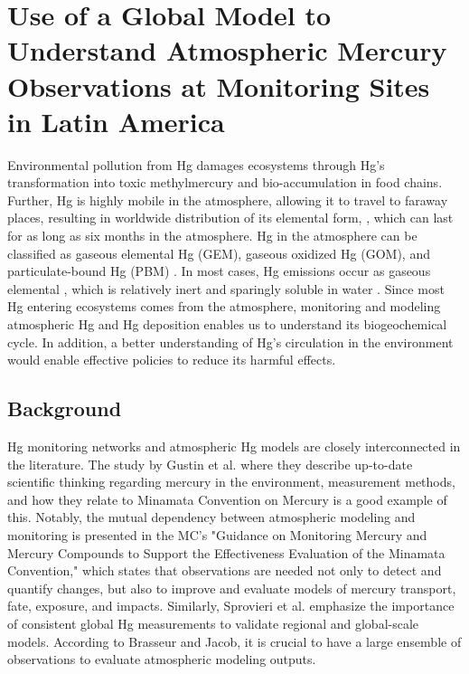 \chapter{Use of a Global Model to Understand Atmospheric Mercury Observations at Monitoring Sites in Latin America }\label{chapter2}
\begin{flushleft}
Environmental pollution from Hg damages ecosystems through Hg's transformation into toxic methylmercury and bio-accumulation in food chains. Further, Hg is highly mobile in the atmosphere, allowing it to travel to faraway places, resulting in worldwide distribution of its elemental form, \hg, which can last for as long as six months in the atmosphere\cite{horowitz_new_2017,shah_improved_2021}. Hg in the atmosphere can be classified as gaseous elemental Hg (GEM), gaseous oxidized Hg (GOM), and particulate-bound Hg (PBM)  \cite{lindberg_synthesis_2007,schroeder_atmospheric_1998,landis_development_2002}. In most cases, Hg emissions occur as gaseous elemental \hg, which is relatively inert and sparingly soluble in water \cite{horowitz_new_2017}. Since most Hg entering ecosystems comes from the atmosphere, monitoring and modeling atmospheric Hg and Hg deposition enables us to understand its biogeochemical cycle. In addition, a better understanding of Hg's circulation in the environment would enable effective policies to reduce its harmful effects.
\end{flushleft}
\section{Background}\label{chapter2_background}
\begin{flushleft}

Hg monitoring networks and atmospheric Hg models are closely interconnected in the literature. The study by Gustin et al.\cite{gustin_mercury_2020} where they describe up-to-date scientific thinking regarding mercury in the environment, measurement methods, and how they relate to Minamata Convention on Mercury is a good example of this. Notably, the mutual dependency between atmospheric modeling and monitoring is presented in the MC's "Guidance on Monitoring Mercury and Mercury Compounds to Support the Effectiveness Evaluation of the Minamata Convention," which states that observations are needed not only to detect and quantify changes, but also to improve and evaluate models of mercury transport, fate, exposure, and impacts\cite{unep_guidance_2021}. Similarly, Sprovieri et al.\cite{sprovieri_atmospheric_2016} emphasize the importance of consistent global Hg measurements to validate regional and global-scale models.  According to Brasseur and Jacob\cite{brasseur_modeling_2017}, it is crucial to have a large ensemble of observations to evaluate atmospheric modeling outputs.
\end{flushleft}

